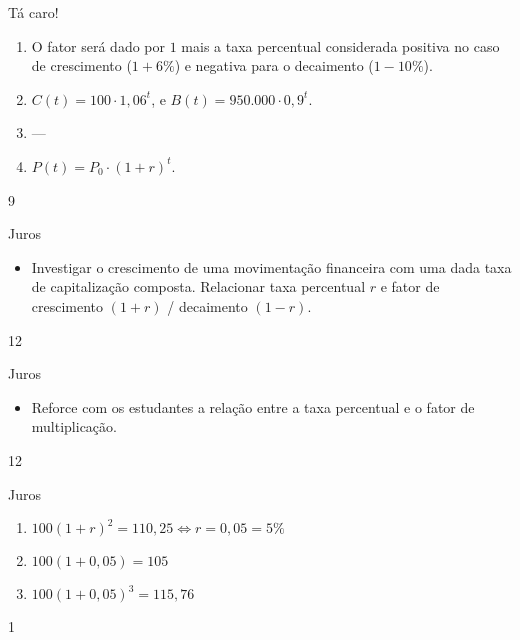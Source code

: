\begin{answer}{Tá caro!}
{\begin{enumerate}
	\item{}
	O fator será dado por $1$ mais a taxa percentual considerada positiva no caso de crescimento ($1+6\%$) e negativa para o decaimento ($1-10\%$).

	\item{}
	$C(t)=100\cdot1,06^{t}$, e $B(t)=950.000\cdot0,9^t$.

	\item{}
	---
	\item{}
	$P(t)=P_0\cdot(1+r)^t$.

	\end{enumerate}
}{9}
\end{answer}
\clearmargin
\begin{objectives}{Juros}
{
\begin{itemize}
\item Investigar o crescimento de uma movimentação financeira com uma dada taxa de capitalização composta. Relacionar taxa percentual $r$ e fator de crescimento $(1+r)$ / decaimento $(1 - r)$.
\end{itemize}
}{1}{2}
\end{objectives}
\begin{sugestions}{Juros}
{
\begin{itemize}
\item Reforce com os estudantes a relação entre a taxa percentual e o fator de multiplicação.
\end{itemize}
}{1}{2}
\end{sugestions}
\begin{answer}{Juros}
{
\begin{enumerate}

\item{}
$100(1+r)^2 =110,25 \iff r=0,05 = 5\%$ 

\item{}
$100(1+0,05)=105$

\item{}
$100(1+0,05)^3=115,76$

\end{enumerate}
}{1}
\end{answer}


